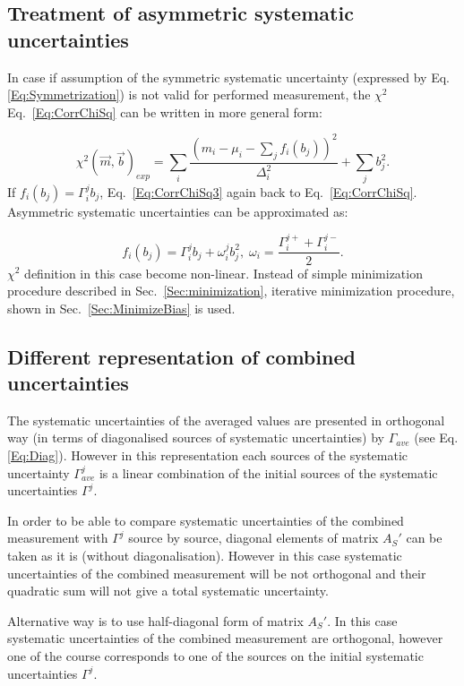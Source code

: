 \subsection{Treatment of asymmetric systematic uncertainties}
\label{Sec:AsymmUncert}

In case if assumption of the symmetric systematic uncertainty (expressed by Eq.\ref{Eq:Symmetrization}) is not valid for performed measurement, the $\chi^2$ Eq.~\ref{Eq:CorrChiSq} can be written in more general form:

\begin{equation}
  \chi^2(\vec{m},\vec{b})_{exp} = \sum_{i} \frac{(m_i-\mu_i-\sum_j f_i(b_j))^2}{\Delta_i^2} + \sum_{j} b_j^2.
  \label{Eq:CorrChiSq3}
\end{equation}
If $f_i(b_j) = \Gamma_i^jb_j$,  Eq.~\ref{Eq:CorrChiSq3} again back to Eq.~\ref{Eq:CorrChiSq}. Asymmetric systematic uncertainties can be approximated as:

\begin{equation}
f_i(b_j) = \Gamma_i^jb_j + \omega_i^jb_j^2, \; \omega_i = \frac{\Gamma_i^{j+} + \Gamma_i^{j-}}{2}.
  \label{Eq:AsymmUnc}
\end{equation}
$\chi^2$ definition in this case become non-linear. Instead of simple minimization procedure described in Sec.~\ref{Sec:minimization}, iterative minimization procedure, shown in Sec.~\ref{Sec:MinimizeBias} is used. 

\subsection{Different representation of combined uncertainties}
\label{Sec:SystRepresentation}

The systematic uncertainties of the averaged values are presented in orthogonal way (in terms of diagonalised sources of systematic uncertainties) by $\Gamma_{ave}$ (see Eq.\ref{Eq:Diag}). However in this representation each sources of the systematic uncertainty $\Gamma_{ave}^j$ is a linear combination of the initial sources of the systematic uncertainties $\Gamma^j$.  

In order to be able to compare systematic uncertainties of the combined measurement with $\Gamma^j$ source by source, diagonal elements of matrix $A_S'$ can be taken as it is (without diagonalisation). However in this case systematic uncertainties of the combined measurement will be not orthogonal and their quadratic sum will not give a total systematic uncertainty.

Alternative way is to use half-diagonal form of matrix $A_S'$. In this case systematic uncertainties of the combined measurement are orthogonal, however one of the course corresponds to one of the sources on the initial systematic uncertainties $\Gamma^j$. 


